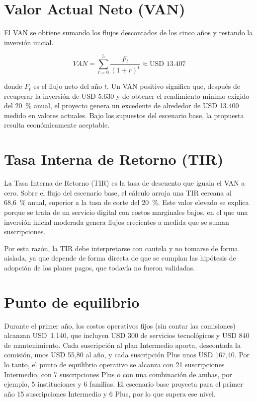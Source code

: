 \section{Valor Actual Neto (VAN)}

El VAN se obtiene sumando los flujos descontados de los cinco años y restando la inversión inicial.

\[
\mathit{VAN} = \sum_{t=0}^{5} \frac{F_t}{(1+r)^t} \approx \text{USD } 13.407
\]

donde $F_t$ es el flujo neto del año $t$. Un VAN positivo significa que, después de recuperar la inversión de USD 5.630 y de obtener el rendimiento mínimo exigido del 20~\% anual, el proyecto genera un excedente de alrededor de USD 13.400 medido en valores actuales. Bajo los supuestos del escenario base, la propuesta resulta económicamente aceptable.

\section{Tasa Interna de Retorno (TIR)}

La Tasa Interna de Retorno (TIR) es la tasa de descuento que iguala el VAN a cero. Sobre el flujo del escenario base, el cálculo arroja una TIR cercana al 68,6~\% anual, superior a la tasa de corte del 20~\%. Este valor elevado se explica porque se trata de un servicio digital con costos marginales bajos, en el que una inversión inicial moderada genera flujos crecientes a medida que se suman suscripciones.

Por esta razón, la TIR debe interpretarse con cautela y no tomarse de forma aislada, ya que depende de forma directa de que se cumplan las hipótesis de adopción de los planes pagos, que todavía no fueron validadas.

\section{Punto de equilibrio}

Durante el primer año, los costos operativos fijos (sin contar las comisiones) alcanzan USD~1.140, que incluyen USD 300 de servicios tecnológicos y USD 840 de mantenimiento. Cada suscripción al plan Intermedio aporta, descontada la comisión, unos USD 55,80 al año, y cada suscripción Plus unos USD 167,40. Por lo tanto, el punto de equilibrio operativo se alcanza con 21 suscripciones Intermedio, con 7 suscripciones Plus o con una combinación de ambas, por ejemplo, 5 instituciones y 6 familias. El escenario base proyecta para el primer año 15 suscripciones Intermedio y 6 Plus, por lo que supera ese nivel.

